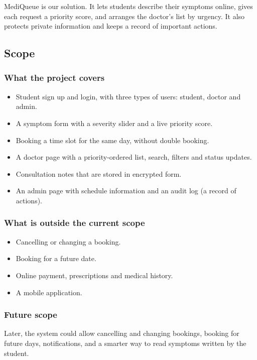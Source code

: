 \documentclass[12pt,a4paper]{article}
\begin{document}
MediQueue is our solution. It lets students describe their symptoms online, gives each request a priority score, and arranges the doctor's list by urgency. It also protects private information and keeps a record of important actions.

\subsection{Scope}
\subsubsection{What the project covers}
\begin{itemize}
  \item Student sign up and login, with three types of users: student, doctor and admin.
  \item A symptom form with a severity slider and a live priority score.
  \item Booking a time slot for the same day, without double booking.
  \item A doctor page with a priority-ordered list, search, filters and status updates.
  \item Consultation notes that are stored in encrypted form.
  \item An admin page with schedule information and an audit log (a record of actions).
\end{itemize}

\subsubsection{What is outside the current scope}
\begin{itemize}
  \item Cancelling or changing a booking.
  \item Booking for a future date.
  \item Online payment, prescriptions and medical history.
  \item A mobile application.
\end{itemize}

\subsubsection{Future scope}
Later, the system could allow cancelling and changing bookings, booking for future days, notifications, and a smarter way to read symptoms written by the student.
\end{document}
